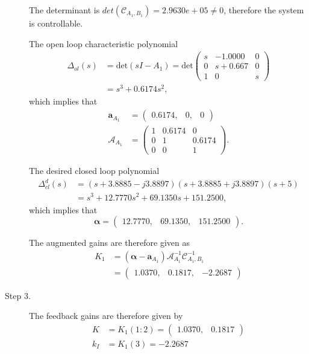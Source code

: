 \begin{description}
The determinant is $det(\mathcal{C}_{A_1,B_1})=2.9630e+05\neq 0$, therefore the system is controllable.  

The open loop characteristic polynomial
\begin{align*}
\Delta_{ol}(s)&=\text{det}(sI-A_1) = \text{det}\begin{pmatrix} 
s &   -1.0000 & 0 \\ 
0 &  s+0.667 & 0 \\ 
1 & 0 & s
\end{pmatrix} \\ &= s^3 + 0.6174s^2,
\end{align*}
which implies that
\begin{align*}
\mathbf{a}_{A_1} &= \begin{pmatrix}0.6174, &        0,  &       0\end{pmatrix} \\
\mathcal{A}_{A_1} &= \begin{pmatrix} 
1 & 0.6174 & 0 \\ 0 & 1 & 0.6174 \\ 0 & 0 & 1
\end{pmatrix}.
\end{align*}

The desired closed loop polynomial
\begin{align*}
\Delta_{cl}^d(s) &= (s+3.8885-j3.8897)(s+3.8885+j3.8897)(s+5)\\
&=s^3+12.7770s^2+69.1350s+151.2500,
\end{align*}
which implies that
\[
\boldsymbol{\alpha} = \begin{pmatrix}12.7770, &  69.1350, &   151.2500\end{pmatrix}.
\]

The augmented gains are therefore given as
\begin{align*}
K_1 &= (\boldsymbol{\alpha}-\mathbf{a}_{A_1})\mathcal{A}_{A_1}^{-1}\mathcal{C}_{A_1,B_1}^{-1} \\
  &= \begin{pmatrix} 1.0370, &    0.1817, &   -2.2687 \end{pmatrix}
\end{align*}

\item[Step 3.]
The feedback gains are therefore given by
\begin{align*}
K &= K_1(1:2) = \begin{pmatrix} 1.0370, &    0.1817 \end{pmatrix} \\
k_I &= K_1(3) = -2.2687
\end{align*}

\end{description}


